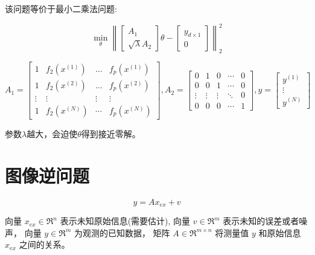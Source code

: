 该问题等价于最小二乘法问题:

\begin{problem}
    \begin{equation}
\min _{\theta}\left\|\left[\begin{array}{r}
A_{1} \\
\sqrt{\lambda} A_{2}
\end{array}\right] \theta-\left[\begin{array}{l}
y_{d \times 1} \\
0
\end{array}\right]\right\|_{2}^{2}
\end{equation}

\begin{equation} A_{1}=\left[\begin{array}{cccc}1 & f_{2}\left(x^{(1)}\right) & \ldots & f_{p}\left(x^{(1)}\right) \\ 1 & f_{2}\left(x^{(2)}\right) & \ldots & f_{p}\left(x^{(2)}\right) \\ \vdots & \vdots & \vdots & \vdots \\ 1 & f_{2}\left(x^{(N)}\right) & \cdots & f_{p}\left(x^{(N)}\right)\end{array}\right],  A_{2}=\left[\begin{array}{ccccc}0 & 1 & 0 & \cdots & 0 \\ 0 & 0 & 1 & \cdots & 0 \\ \vdots & \vdots & \vdots & \ddots & 0 \\ 0 & 0 & 0 & \cdots & 1\end{array}\right], y=\left[\begin{array}{c}y^{(1)} \\ \vdots \\ y^{(N)}\end{array}\right] \end{equation}
\end{problem}

参数$\lambda$越大，会迫使$\theta$得到接近零解。

\section{图像逆问题}

\begin{problem}
    \begin{equation} y=A x_{e x}+v \end{equation}

向量 $ x_{e x} \in \mathfrak{R}^{n} $ 表示未知原始信息(需要估计),
向量 $ v \in \mathfrak{R}^{m} $ 表示未知的误差或者噪声，
向量 $ y \in \mathfrak{R}^{m} $ 为观测的已知数据，
矩阵 $ A \in \mathfrak{R}^{m \times n} $ 将测量值 $ y $ 和原始信息 $ x_{e x} $ 之间的关系。


\end{problem}

